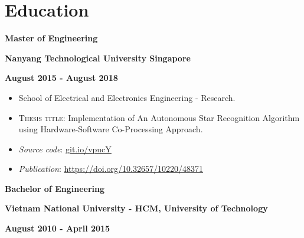 \documentclass[10pt]{article}
\begin{document}
    \vspace{2mm}
    \section{Education}
        \vspace{-2mm}
        \begin{multicols}{3}
                \textbf{Master of Engineering}

            \columnbreak

                \textbf{Nanyang Technological University Singapore}

            \columnbreak

            \begin{flushright}
                \textbf{August 2015 - August 2018}
            \end{flushright}
        \end{multicols}

        \vspace{-5mm}
        \begin{itemize}[noitemsep]
            \item School of Electrical and Electronics Engineering - Research.
            \item \textsc{Thesis title}: Implementation of An Autonomous Star Recognition Algorithm using Hardware-Software Co-Processing Approach.
            \item \emph{Source code}: \href{https://git.io/vpucY}{git.io/vpucY}
            \item \emph{Publication}: \href{https://doi.org/10.32657/10220/48371}{https://doi.org/10.32657/10220/48371}
        \end{itemize}
        \vspace{-2mm}

        \begin{multicols}{3}
            \begin{flushleft}
                \textbf{Bachelor of Engineering}
            \end{flushleft}

            \columnbreak

            \begin{center}
                \textbf{Vietnam National University - HCM, University of Technology}
            \end{center}

            \columnbreak

            \begin{flushright}
                \textbf{August 2010 - April 2015}
            \end{flushright}
        \end{multicols}
\end{document}
